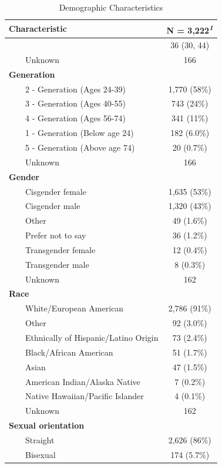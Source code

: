 \documentclass[
  letterpaper,
]{article}
\begin{document}
\begin{longtable}{lc}

\caption{\label{tbl-DemsTable}Demographic Characteristics}

\tabularnewline

\toprule
\textbf{Characteristic} & \textbf{N = 3,222}\textsuperscript{\textit{1}} \\ 
\midrule\addlinespace[2.5pt]
{\bfseries Age} & 36 (30, 44) \\ 
    Unknown & 166 \\ 
{\bfseries Generation} &  \\ 
    2 - Generation (Ages 24-39) & 1,770 (58\%) \\ 
    3 - Generation (Ages 40-55) & 743 (24\%) \\ 
    4 - Generation (Ages 56-74) & 341 (11\%) \\ 
    1 - Generation (Below age 24) & 182 (6.0\%) \\ 
    5 - Generation (Above age 74) & 20 (0.7\%) \\ 
    Unknown & 166 \\ 
{\bfseries Gender} &  \\ 
    Cisgender female & 1,635 (53\%) \\ 
    Cisgender male & 1,320 (43\%) \\ 
    Other & 49 (1.6\%) \\ 
    Prefer not to say & 36 (1.2\%) \\ 
    Transgender female & 12 (0.4\%) \\ 
    Transgender male & 8 (0.3\%) \\ 
    Unknown & 162 \\ 
{\bfseries Race} &  \\ 
    White/European American & 2,786 (91\%) \\ 
    Other & 92 (3.0\%) \\ 
    Ethnically of Hispanic/Latino Origin & 73 (2.4\%) \\ 
    Black/African American & 51 (1.7\%) \\ 
    Asian & 47 (1.5\%) \\ 
    American Indian/Alaska Native & 7 (0.2\%) \\ 
    Native Hawaiian/Pacific Islander & 4 (0.1\%) \\ 
    Unknown & 162 \\ 
{\bfseries Sexual orientation} &  \\ 
    Straight & 2,626 (86\%) \\ 
    Bisexual & 174 (5.7\%) \\ 

\end{longtable}
\end{document}

